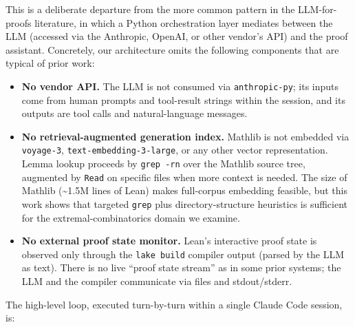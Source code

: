 \documentclass[11pt]{article}
\theoremstyle{definition}
\begin{document}
This is a deliberate departure from the more common pattern in the LLM-for-proofs
literature, in which a Python orchestration layer mediates between the LLM (accessed
via the Anthropic, OpenAI, or other vendor's API) and the proof assistant.
Concretely, our architecture omits the following components that are typical of
prior work:

\begin{itemize}
    \item \textbf{No vendor API.} The LLM is not consumed via \texttt{anthropic-py};
    its inputs come from human prompts and tool-result strings within the session,
    and its outputs are tool calls and natural-language messages.

    \item \textbf{No retrieval-augmented generation index.} Mathlib is not embedded
    via \texttt{voyage-3}, \texttt{text-embedding-3-large}, or any other vector
    representation. Lemma lookup proceeds by \texttt{grep -rn} over the Mathlib
    source tree, augmented by \texttt{Read} on specific files when more context is
    needed. The size of Mathlib (\textasciitilde 1.5M lines of Lean) makes
    full-corpus embedding feasible, but this work shows that targeted \texttt{grep}
    plus directory-structure heuristics is sufficient for the extremal-combinatorics
    domain we examine.

    \item \textbf{No external proof state monitor.} Lean's interactive proof state
    is observed only through the \texttt{lake build} compiler output (parsed by the
    LLM as text). There is no live ``proof state stream'' as in some prior systems;
    the LLM and the compiler communicate via files and stdout/stderr.
\end{itemize}

The high-level loop, executed turn-by-turn within a single Claude Code session, is:
\end{document}
